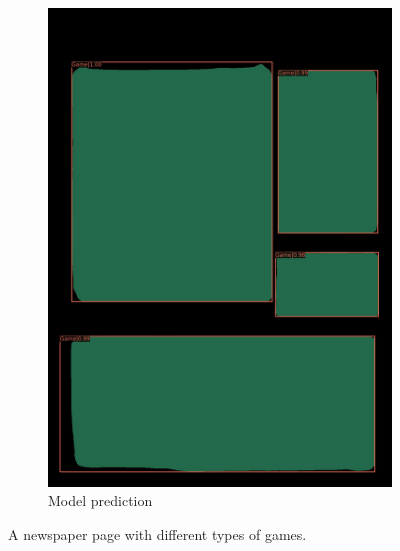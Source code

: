 \documentclass[aspectratio=1610]{beamer}
\begin{document}
\begin{frame}
\begin{figure}
\begin{subfigure}{.25\textwidth}
  \includegraphics[width=0.99\linewidth, clip=true, trim = 0mm 0mm 0mm 0mm]{figures/labels-vanilla-0.75/y3LXnnL.jpg}
  \caption{Model prediction}
\end{subfigure}
\caption{A newspaper page with different types of games.}
\label{fig:stocks}
\end{figure}
\end{frame}
\normalpage
\end{document}
